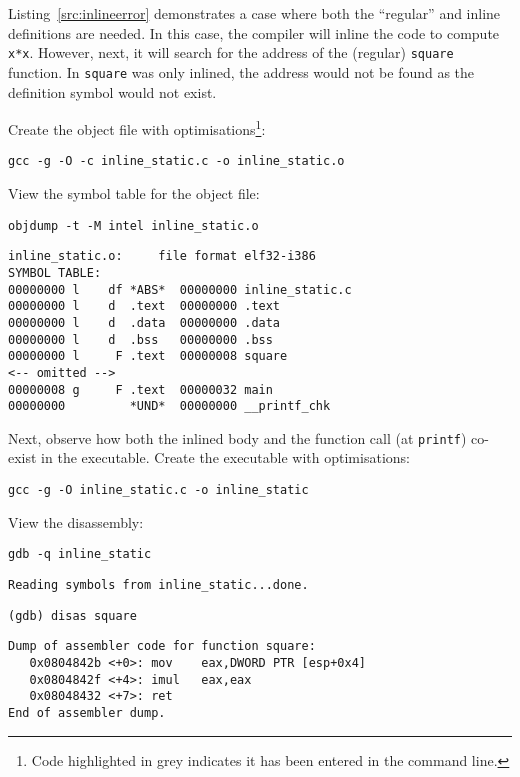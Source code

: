 Listing~\ref{src:inlineerror} demonstrates a case where both the ``regular'' and inline definitions are needed. In this case, the compiler will inline the code to compute \texttt{x*x}. However, next, it will search for the address of the (regular) \texttt{square} function. In \texttt{square} was only inlined, the address would not be found as the definition symbol would not exist.

Create the object file with optimisations\footnote{Code highlighted in grey indicates it has been entered in the command line.}:
\begin{lstlisting}[style=terminal]
gcc -g -O -c inline_static.c -o inline_static.o
\end{lstlisting}
View the symbol table for the object file:
\begin{lstlisting}[style=terminal]
objdump -t -M intel inline_static.o
\end{lstlisting}
\begin{verbatim}
inline_static.o:     file format elf32-i386
SYMBOL TABLE:
00000000 l    df *ABS*	00000000 inline_static.c
00000000 l    d  .text	00000000 .text
00000000 l    d  .data	00000000 .data
00000000 l    d  .bss	00000000 .bss
00000000 l     F .text	00000008 square
<-- omitted -->
00000008 g     F .text	00000032 main
00000000         *UND*	00000000 __printf_chk
\end{verbatim}
Next, observe how both the inlined body and the function call (at \texttt{printf}) co-exist in the executable. Create the executable with optimisations:
\begin{lstlisting}[style=terminal]
gcc -g -O inline_static.c -o inline_static
\end{lstlisting}
View the disassembly:
\begin{lstlisting}[style=terminal]
gdb -q inline_static 
\end{lstlisting}
\begin{verbatim}
Reading symbols from inline_static...done.   
\end{verbatim}
\begin{lstlisting}[style=terminal]
(gdb) disas square
\end{lstlisting}
\begin{verbatim}
Dump of assembler code for function square:
   0x0804842b <+0>:	mov    eax,DWORD PTR [esp+0x4]
   0x0804842f <+4>:	imul   eax,eax
   0x08048432 <+7>:	ret    
End of assembler dump.
\end{verbatim}
